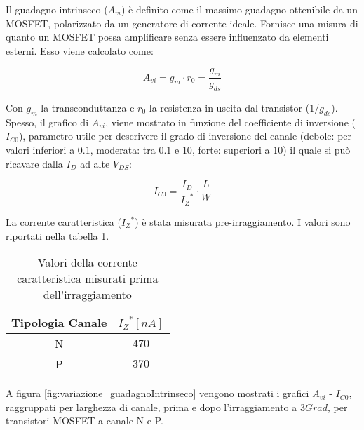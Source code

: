 Il guadagno intrinseco ($A_{vi}$) è definito come il massimo guadagno ottenibile da un MOSFET, polarizzato da un generatore di corrente ideale.
Fornisce una misura di quanto un MOSFET possa amplificare senza essere influenzato da elementi esterni.
Esso viene calcolato come:

\begin{equation}
    A_{vi} = g_{m} \cdot r_0 = \frac{g_{m}}{g_{ds}}
\end{equation}

Con $g_m$ la transconduttanza e $r_0$ la resistenza in uscita dal transistor (${1}/{g_{ds}}$). Spesso, il grafico di $A_{vi}$, viene mostrato in funzione del coefficiente di inversione ($I_{C0}$), parametro utile per descrivere il grado di inversione del canale (debole: per valori inferiori a $0.1$, moderata: tra $0.1$ e $10$, forte: superiori a $10$) il quale si può ricavare dalla $I_D$ ad alte $V_{DS}$:

\begin{equation}
    I_{C0} = \frac{I_{D}}{{I_{Z}}^{*}} \cdot \frac{L}{W}
\end{equation}

La corrente caratteristica (${I_{Z}}^{*}$) è stata misurata pre-irraggiamento. I valori sono riportati nella tabella \ref{tab:corrente_caratteristica}.

\begin{table}[ht]
    \centering
    \begin{tabular}{c c}
        \toprule
        Tipologia Canale & ${I_{Z}}^{*}[nA]$ \\
        \midrule
        N                & $470$     \\
        P                & $370$     \\
        \bottomrule
    \end{tabular}
    \caption[Valori estratti $I_z^*$]{Valori della corrente caratteristica misurati prima dell'irraggiamento}
    \label{tab:corrente_caratteristica}
\end{table}


A figura \ref{fig:variazione_guadagnoIntrinseco} vengono mostrati i grafici $A_{vi}$ - $I_{C0}$, raggruppati per larghezza di canale, prima e dopo l'irraggiamento a $3Grad$, per transistori MOSFET a canale N e P.


